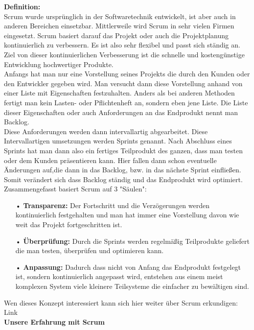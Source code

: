\textbf{Definition:}\\
Scrum wurde ursprünglich in der Softwaretechnik entwickelt, ist aber auch in anderen Bereichen einsetzbar. Mittlerweile wird Scrum in sehr vielen Firmen eingesetzt. Scrum basiert darauf das Projekt oder auch die Projektplanung kontinuierlich zu verbessern. Es ist also sehr flexibel und passt sich ständig an. Ziel von dieser kontinuierlichen Verbesserung ist die schnelle und kostengünstige Entwicklung hochwertiger Produkte. \\
Anfangs hat man nur eine Vorstellung seines Projekts die durch den Kunden oder den Entwickler gegeben wird. Man versucht dann diese Vorstellung anhand von einer Liste mit Eigenschaften festzuhalten. Anders als bei anderen Methoden fertigt man kein Lasten- oder Pflichtenheft an, sondern eben jene Liste. Die Liste dieser Eigenschaften oder auch Anforderungen an das Endprodukt nennt man Backlog.\\
Diese Anforderungen werden dann intervallartig abgearbeitet. Diese Intervallartigen umsetzungen werden Sprints genannt. Nach Abschluss eines Sprints hat man dann also ein fertiges Teilprodukt des ganzen, dass man testen oder dem Kunden präsentieren kann. Hier fallen dann schon eventuelle Änderungen auf,die dann in das Backlog, bzw. in das nächste Sprint einfließen. Somit verändert sich dass Backlog ständig und das Endprodukt wird optimiert.\\
Zusammengefasst basiert Scrum auf 3 "Säulen":

\begin{itemize}
\item[•] \textbf{Transparenz:} Der Fortschritt und die Verzögerungen werden kontinuierlich festgehalten und man hat immer eine Vorstellung davon wie weit das Projekt fortgeschritten ist.
\item[•] \textbf{Überprüfung:} Durch die Sprints werden regelmäßig Teilprodukte geliefert die man testen, überprüfen und optimieren kann. 
\item[•] \textbf{Anpassung:} Dadurch dass nicht von Anfang das Endprodukt festgelegt ist, sondern kontinuierlich angepasst wird, entstehen aus einem meist komplexen System viele kleinere Teilsysteme die einfacher zu bewältigen sind. 
\end{itemize}

Wen dieses Konzept interessiert kann sich hier weiter über Scrum erkundigen: Link\\

\textbf{Unsere Erfahrung mit Scrum}\\

